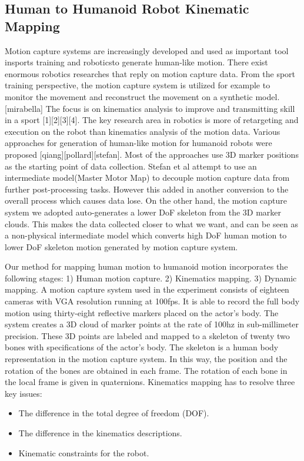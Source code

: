 \subsection{Human to Humanoid Robot Kinematic Mapping}\label{sec:sec:mocap}

Motion capture systems are increasingly developed and used as important tool insports training and roboticsto generate human-like motion. 
There exist enormous robotics researches that reply on motion capture data. 
From the sport training perspective, the motion capture system is utilized for example to monitor the movement and reconstruct the movement on a synthetic model. 
[mirabella] The focus is on kinematics analysis to improve and transmitting skill in a sport [1][2][3][4]. 
The key research area in robotics is more of retargeting and execution on the robot than kinematics analysis of the motion data.  
Various approaches for generation of human-like motion for humanoid robots were proposed [qiang][pollard][stefan]. 
Most of the approaches use 3D marker positions as the starting point of data collection.
Stefan et al attempt to use an intermediate model(Master Motor Map) to decouple motion capture data from further post-processing tasks. 
However this added in another conversion to the overall process which causes data lose. 
On the other hand, the motion capture system we adopted auto-generates a lower DoF skeleton from the 3D marker clouds. 
This makes the data collected closer to what we want, and can be seen as a non-physical intermediate model which converts high DoF human motion to lower DoF skeleton motion generated by motion capture system. 

Our method for mapping human motion to humanoid motion incorporates the following stages: 1) Human motion capture. 2) Kinematics mapping. 3) Dynamic mapping. 
A motion capture system used in the experiment consists of eighteen cameras with VGA resolution running at 100fps. 
It is able to record the full body motion using thirty-eight reflective markers placed on the actor's body. 
The system creates a 3D cloud of marker points at the rate of 100hz in sub-millimeter precision. 
These 3D points are labeled and mapped to a skeleton of twenty two bones with specifications of the actor's body. 
The skeleton is a human body representation in the motion capture system. 
In this way, the position and the rotation of the bones are obtained in each frame.
The rotation of each bone in the local frame is given in quaternions.%
Kinematics mapping has to resolve three key issues: 
\begin{itemize}
	\item The difference in the total degree of freedom (DOF). 
	\item	The difference in the kinematics descriptions. 
	\item	Kinematic constraints for the robot.
\end{itemize}

